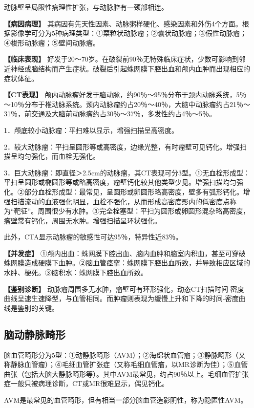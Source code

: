 动脉壁呈局限性病理性扩张，与动脉腔有一颈部相连。

\textbf{【病因病理】}
其病因有先天性因素、动脉粥样硬化、感染因素和外伤4个方面。根据影像学可分为5种病理类型：①粟粒状动脉瘤；②囊状动脉瘤；③假性动脉瘤；④梭形动脉瘤；⑤壁间动脉瘤。

\textbf{【临床表现】}
好发于20～70岁。在破裂前90％无特殊临床症状，少数可影响到邻近神经或脑结构而产生症状。破裂后引起蛛网膜下腔出血和颅内血肿而出现相应的症状体征。

\textbf{【CT表现】}
颅内动脉瘤好发于脑动脉，约90％～95％分布于颈内动脉系统，5％～10％分布于椎动脉系统。颈内动脉瘤约占20％～40％，大脑中动脉瘤约占21％～31％，前交通及大脑前动脉瘤约占30％～37％，多发性约占4％～5％。

1．颅底较小动脉瘤：平扫难以显示，增强扫描呈高密度。

2．较大动脉瘤：平扫呈圆形等或高密度，边缘光整，有时瘤壁可见钙化。增强扫描呈均匀强化，而血栓无强化。

3．巨大动脉瘤：即直径＞2.5cm的动脉瘤，其CT表现可分3型。①无血栓形成型：平扫呈圆形或椭圆形等或略高密度，瘤壁钙化较其他类型少见。增强扫描均匀强化。②部分血栓形成型：最常见，呈圆形或卵圆形略高密度，壁多有弧形钙化。增强扫描流动的血液强化明显，血栓不强化，从而形成高密度影内的低密度点称为“靶征”。周围很少有水肿。③完全栓塞型：平扫为圆形或卵圆形混杂略高密度，瘤壁常有钙化，周围无水肿。增强扫描呈环状强化。

此外，CTA显示动脉瘤的敏感性可达95％，特异性近83％。

\textbf{【并发症】}
①颅内出血：蛛网膜下腔出血、脑内血肿和脑室内积血，甚至可穿破蛛网膜造成硬膜下血肿。②脑血管痉挛：蛛网膜下腔出血所致，并导致相应区域的水肿、梗死。③脑积水：蛛网膜下腔出血所致。

\textbf{【鉴别诊断】}
动脉瘤周围多无水肿，瘤壁可有环形强化，动态CT扫描时间-密度曲线呈速生速降型，与血管相同。而肿瘤则表现为缓慢上升和下降的时间-密度曲线是鉴别的关键。

\subsection{脑动静脉畸形}

脑血管畸形分为5型：①动静脉畸形（AVM）；②海绵状血管瘤；③静脉畸形（又称静脉血管瘤）；④毛细血管扩张症（又称毛细血管瘤，以MR诊断为佳）；⑤血管曲张（包括大脑大静脉畸形等）。其中AVM最常见，约占90％以上。毛细血管扩张症一般只被病理诊断，CT或MR很难显示，偶见钙化。

AVM是最常见的血管畸形，但有相当一部分脑血管造影阴性，称为隐匿性AVM。


